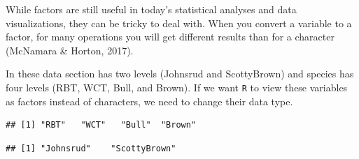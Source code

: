 \documentclass[]{article}
\newenvironment{Shaded}{\begin{snugshade}}{\end{snugshade}}
\newcommand{\KeywordTok}[1]{\textcolor[rgb]{0.13,0.29,0.53}{\textbf{#1}}}
\newcommand{\StringTok}[1]{\textcolor[rgb]{0.31,0.60,0.02}{#1}}
\newcommand{\OperatorTok}[1]{\textcolor[rgb]{0.81,0.36,0.00}{\textbf{#1}}}
\newcommand{\NormalTok}[1]{#1}
\begin{document}
While factors are still useful in today's statistical analyses and data
visualizations, they can be tricky to deal with. When you convert a
variable to a factor, for many operations you will get different results
than for a character (McNamara \& Horton, 2017).

In these data section has two levels (Johnsrud and ScottyBrown) and
species has four levels (RBT, WCT, Bull, and Brown). If we want
\texttt{R} to view these variables as factors instead of characters, we
need to change their data type.

\vspace{0.25cm}

\begin{Shaded}
\end{Shaded}

\begin{verbatim}
## [1] "RBT"   "WCT"   "Bull"  "Brown"
\end{verbatim}

\begin{Shaded}
\end{Shaded}

\begin{verbatim}
## [1] "Johnsrud"    "ScottyBrown"
\end{verbatim}

\begin{Shaded}
\end{Shaded}

\newpage
\end{document}
